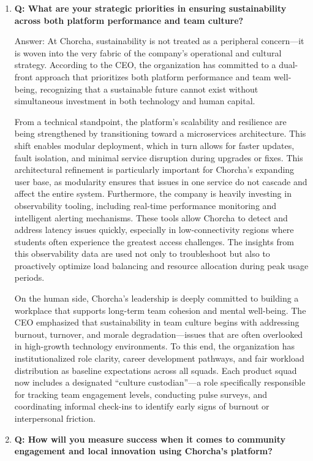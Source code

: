 \documentclass[12pt,a4paper,oneside]{book}
\begin{document}
\begin{enumerate}
\item \textbf{Q: What are your strategic priorities in ensuring sustainability across both platform performance and team culture?}

Answer: At Chorcha, sustainability is not treated as a peripheral concern—it is woven into the very fabric of the company’s operational and cultural strategy. According to the CEO, the organization has committed to a dual-front approach that prioritizes both platform performance and team well-being, recognizing that a sustainable future cannot exist without simultaneous investment in both technology and human capital.

From a technical standpoint, the platform’s scalability and resilience are being strengthened by transitioning toward a microservices architecture. This shift enables modular deployment, which in turn allows for faster updates, fault isolation, and minimal service disruption during upgrades or fixes. This architectural refinement is particularly important for Chorcha’s expanding user base, as modularity ensures that issues in one service do not cascade and affect the entire system. Furthermore, the company is heavily investing in observability tooling, including real-time performance monitoring and intelligent alerting mechanisms. These tools allow Chorcha to detect and address latency issues quickly, especially in low-connectivity regions where students often experience the greatest access challenges. The insights from this observability data are used not only to troubleshoot but also to proactively optimize load balancing and resource allocation during peak usage periods.

On the human side, Chorcha’s leadership is deeply committed to building a workplace that supports long-term team cohesion and mental well-being. The CEO emphasized that sustainability in team culture begins with addressing burnout, turnover, and morale degradation—issues that are often overlooked in high-growth technology environments. To this end, the organization has institutionalized role clarity, career development pathways, and fair workload distribution as baseline expectations across all squads. Each product squad now includes a designated “culture custodian”—a role specifically responsible for tracking team engagement levels, conducting pulse surveys, and coordinating informal check-ins to identify early signs of burnout or interpersonal friction.

\item \textbf{Q: How will you measure success when it comes to community engagement and local innovation using Chorcha’s platform?}


\end{enumerate}
\end{document}
